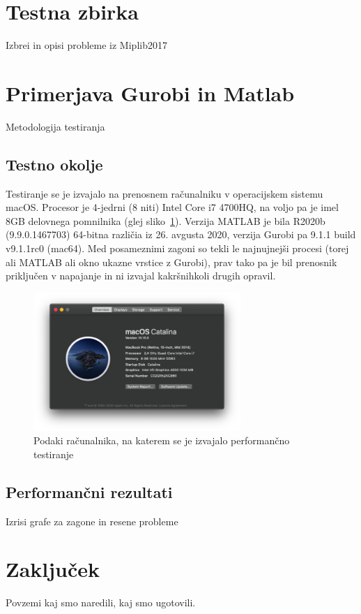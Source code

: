 \documentclass[a4paper,11pt]{article}
\begin{document}
\section{Testna zbirka}
\label{benchmark_data}
Izbrei in opisi probleme iz Miplib2017



\section{Primerjava Gurobi in Matlab}
Metodologija testiranja

\subsection{Testno okolje}
Testiranje se je izvajalo na prenosnem računalniku v operacijskem sistemu macOS. Procesor je 4-jedrni (8 niti) Intel Core i7 4700HQ, na voljo pa je imel 8GB delovnega pomnilnika (glej sliko~\ref{img:davids_mbp}). Verzija MATLAB je bila R2020b (9.9.0.1467703) 64-bitna različia iz 26. avgusta 2020, verzija Gurobi pa 9.1.1 build v9.1.1rc0 (mac64). Med posameznimi zagoni so tekli le najnujnejši procesi (torej ali MATLAB ali okno ukazne vrstice z Gurobi), prav tako pa je bil prenosnik priključen v napajanje in ni izvajal kakršnihkoli drugih opravil.

\begin{figure}[htpb]
	\centering
	\includegraphics[width=0.7\textwidth]{images/davids-mbp.png}
	\caption{Podaki računalnika, na katerem se je izvajalo performančno testiranje}
	\label{img:davids_mbp}
\end{figure}

\subsection{Performančni rezultati}
Izrisi grafe za zagone in resene probleme

\section{Zaključek}
Povzemi kaj smo naredili, kaj smo ugotovili.
\end{document}
